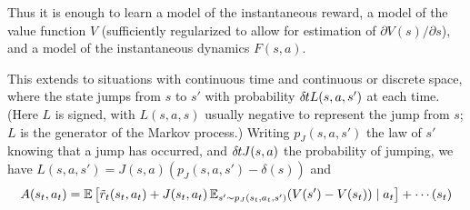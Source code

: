 Thus it is enough to learn a model of the instantaneous reward, a model
of the value function $V$ (sufficiently regularized to allow for
estimation of $\partial V(s)/\partial s$), and a model of the
instantaneous dynamics $F(s,a)$.

This extends to situations with continuous time and continuous or
discrete space, where the state jumps from $s$ to $s'$ with probability $\delta\hspace{-.06em}t
L(s,a,s')$ at each time. (Here $L$ is signed, with $L(s,a,s)$ usually
negative to represent the jump from $s$; $L$ is the generator of the
Markov process.) Writing $p_J(s,a,s')$ the law of
$s'$ knowing that a jump has occurred, and $\delta\hspace{-.06em}t J(s,a)$ the
probability of jumping, we have $L(s,a,s')=J(s,a)(p_J(s,a,s')-\delta(s))$
and
\begin{equation}
A(s_t,a_t)=\mathbb{E}\left[\tilde{r}_t(s_t,a_t)+J(s_t,a_t)\,\mathbb{E}_{s'\sim
p_J(s_t,a_t,s')} (V(s')-V(s_t))
\mid a_t\right]+\cdots(s_t)
\end{equation}

